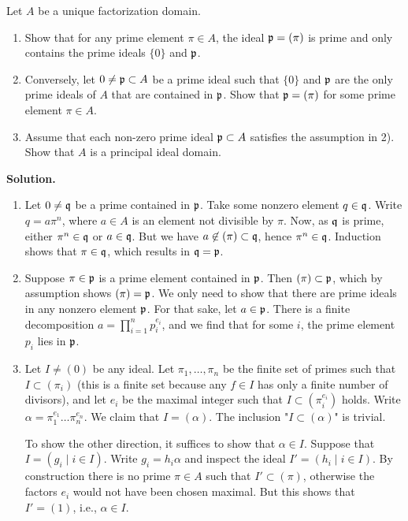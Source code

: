 \documentclass[a4paper,11pt]{article}
\begin{document}
Let $A$ be a unique factorization domain. 
\begin{enumerate}
    \item Show that for any prime element $\pi \in A$, the ideal $\mathfrak{p} = (\pi)$ is 
        prime and only contains the prime ideals $\{0\}$ and $\mathfrak{p}$.
    \item Conversely, let $0 \neq \mathfrak{p} \subset A$ be a prime ideal such that $\{0\}$
        and $\mathfrak{p}$ are the only prime ideals of $A$ that are contained in $\mathfrak{p}$. 
        Show that $\mathfrak{p} = (\pi)$ for some prime element $\pi \in A$. 
    \item Assume that each non-zero prime ideal $\mathfrak{p} \subset A$ satisfies the
        assumption in 2). Show that $A$ is a principal ideal domain. 
\end{enumerate}

\textbf{Solution.}
\begin{enumerate}
    \item Let $0 \neq \mathfrak{q}$ be a prime contained in $\mathfrak{p}$. Take some nonzero
        element $q \in \mathfrak{q}$. Write $q = a \pi^n$, where $a \in A$ is an element
        not divisible by $\pi$. Now, as $\mathfrak{q}$ is prime, either $\pi^n \in \mathfrak{q}$ or 
        $a \in \mathfrak{q}$. But we have $a \not \in (\pi) \subset \mathfrak{q}$, hence
        $\pi^n \in \mathfrak{q}$. Induction shows that $\pi \in \mathfrak{q}$, which results in
        $\mathfrak{q} = \mathfrak{p}$. 

    \item Suppose $\pi \in \mathfrak{p}$ is a prime element contained in $\mathfrak{p}$. Then
        $(\pi) \subset \mathfrak{p}$, which by assumption shows $(\pi) = \mathfrak{p}$. 
        We only need to show that there are prime ideals in any
        nonzero element $\mathfrak{p}$. For that sake, let $a \in \mathfrak{p}$. There is a finite
        decomposition $a = \prod_{i=1}^n p_i^{e_i}$, and we find 
        that for some $i$, the prime element $p_i$ lies in $\mathfrak{p}$. 

    \item Let $I \neq (0)$ be any ideal. Let $\pi_1, \dots, \pi_n$ be the
        finite set of primes such that $I \subset (\pi_i)$ (this is a finite set
        because any $f \in I$ has only a finite number of divisors), and let
        $e_i$ be the maximal integer such that $I \subset (\pi_i^{e_i})$ holds.
        Write $\alpha = \pi_1^{e_1} \dots \pi_n^{e_n}$. We claim that $I =
        (\alpha)$. The inclusion "$I \subset (\alpha)$" is trivial. 

        To show the other direction, it suffices to show that $\alpha \in I$. 
        Suppose that $I = (g_i \mid i \in I)$. Write $g_i = h_i \alpha$ and inspect
        the ideal $I' = (h_i \mid i \in I)$. By construction there is no 
        prime $\pi \in A$ such that $I' \subset (\pi)$, otherwise the
        factors $e_i$ would not have been chosen maximal. But this shows that 
        $I' = (1)$, i.e., $\alpha \in I$. 


\end{enumerate}
\end{document}
